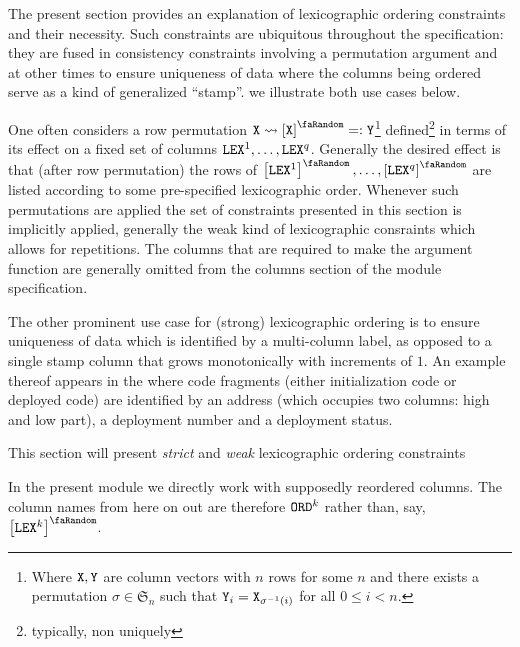 The present section provides an explanation of lexicographic ordering constraints and their necessity.  Such constraints are ubiquitous throughout the \zkEvm{} specification: they are fused in consistency constraints involving a permutation argument and at other times to ensure uniqueness of data where the columns being ordered serve as a kind of generalized ``stamp''. we illustrate both use cases below.

One often considers a row permutation $\col{X}\rightsquigarrow \order{\col{X}} =: \col{Y}$\footnote{Where $\texttt{X}, \texttt{Y}$ are column vectors with $n$ rows for some $n$ and there exists a permutation $\sigma\in\mathfrak{S}_n$ such that $\texttt{Y}_i = \texttt{X}_{\sigma^{-1}(i)}$ for all $0\leq i < n$.} defined\footnote{typically, non uniquely} in terms of its effect on a fixed set of columns $\texttt{LEX}^{1},\dots,\texttt{LEX}^{q}$. Generally the desired effect is that (after row permutation) the rows of $\order{\lex^{1}},\dots,\order{\lex^{q}}$ are listed according to some pre-specified lexicographic order. Whenever such permutations are applied the set of constraints presented in this section is implicitly applied, generally the weak kind of lexicographic consraints which allows for repetitions. The columns that are required to make the argument function are generally omitted from the columns section of the module specification.

The other prominent use case for (strong) lexicographic ordering is to ensure uniqueness of data which is identified by a multi-column label, as opposed to a single stamp column that grows monotonically with increments of $1$. An example thereof appears in the \romMod{} where code fragments (either initialization code or deployed code) are identified by an address (which occupies two columns: high and low part), a deployment number and a deployment status.

\saNote{} This section will present \emph{strict} and \emph{weak} lexicographic ordering constraints

\saNote{} In the present module we directly work with supposedly reordered columns. The column names from here on out are therefore $\texttt{ORD}^k$ rather than, say, $\order{\lex^{k}}$.  

